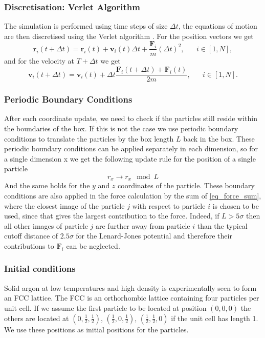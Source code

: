 \documentclass[twoside]{article}
\begin{document}
\subsubsection*{Discretisation: Verlet Algorithm}

The simulation is performed using time steps of size $\Delta t$, the equations of motion are then discretised using the Verlet algorithm \cite{ref_verlet}. For the position vectors we get
\begin{equation}\label{eq_verlet_pos}
\mathbf{r}_i(t+\Delta t) = \mathbf{r}_i(t) + \mathbf{v}_i(t)\Delta t + \frac{\mathbf{F}_i}{m}(\Delta t) ^2,  \hspace{20pt} i\in [1, N],
\end{equation}
and for the velocity at $T+\Delta t$ we get
\begin{equation}\label{eq_verlet_vel}
\mathbf{v}_i(t+\Delta t) = \mathbf{v}_i(t) + \Delta t \frac{\mathbf{F}_i(t + \Delta t) + \mathbf{F}_i(t)}{2m},  \hspace{20pt} i\in [1, N].
\end{equation}

\subsubsection*{Periodic Boundary Conditions}
After each coordinate update, we need to check if the particles still reside within the boundaries of the box. If this is not the case we use periodic boundary conditions to translate the particles by the box length $L$ back in the box. These periodic boundary conditions can be applied separately in each dimension, so for a single dimension x we get the following update rule for the position of a single particle
\begin{equation}\label{eq_pbc}
r_x \rightarrow r_x \mod{L}
\end{equation}
And the same holds for the $y$ and $z$ coordinates of the particle. These boundary conditions are also applied in the force calculation by the sum of \eqref{eq_force_sum}, where the closest image of the particle $j$ with respect to particle $i$ is chosen to be used, since that gives the largest contribution to the force. Indeed, if $L > 5\sigma$ then all other images of particle $j$ are further away from particle $i$ than the typical cutoff distance of $2.5\sigma$ for the Lenard-Jones potential and therefore their contributions to $\mathbf{F}_i$ can be neglected.


\subsubsection*{Initial conditions}
Solid argon at low temperatures and high density is experimentally seen to form an FCC lattice. The FCC is an orthorhombic lattice containing four particles per unit cell. If we assume the first particle to be located at position $(0,0,0)$ the others are located at $(0,\frac{1}{2},\frac{1}{2})$, $(\frac{1}{2},0,\frac{1}{2})$, $(\frac{1}{2},\frac{1}{2},0)$ if the unit cell has length 1. We use these positions as initial positions for the particles.
\end{document}
